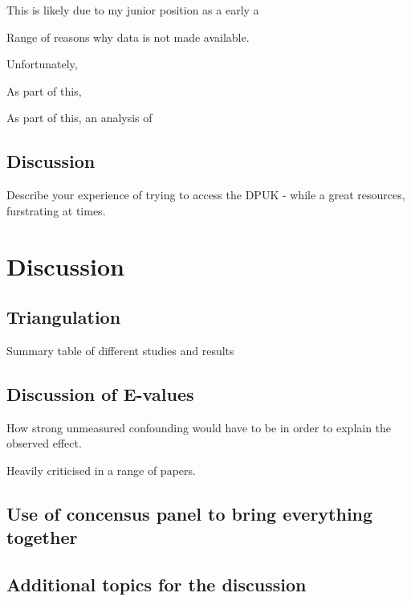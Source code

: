 \documentclass[a4paper, twoside]{templates/ociamthesis}
\begin{document}
This is likely due to my junior position as a early a

Range of reasons why data is not made available.

Unfortunately,

As part of this,

As part of this, an analysis of

\hypertarget{discussion-4}{%
\section{Discussion}\label{discussion-4}}

Describe your experience of trying to access the DPUK - while a great resources, furstrating at times.

\hypertarget{discussion-heading}{%
\chapter{Discussion}\label{discussion-heading}}

\hypertarget{triangulation}{%
\section{Triangulation}\label{triangulation}}

Summary table of different studies and results

\hypertarget{discussion-of-e-values}{%
\section{Discussion of E-values}\label{discussion-of-e-values}}

How strong unmeasured confounding would have to be in order to explain the observed effect.

Heavily criticised in a range of papers.

\hypertarget{use-of-concensus-panel-to-bring-everything-together}{%
\section{Use of concensus panel to bring everything together}\label{use-of-concensus-panel-to-bring-everything-together}}

\hypertarget{additional-topics-for-the-discussion}{%
\section{Additional topics for the discussion}\label{additional-topics-for-the-discussion}}
\end{document}
